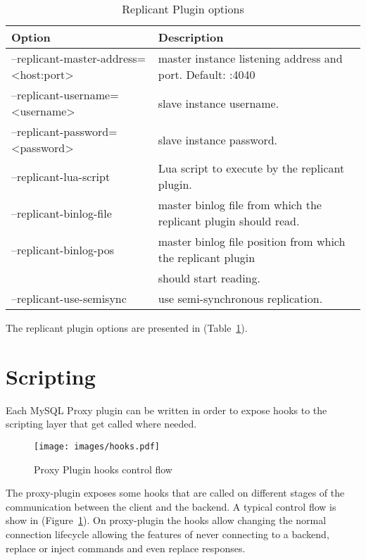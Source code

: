 \begin{table}[h!]
\centering
	\footnotesize
    \begin{tabular}{ | l | l |}
    \hline
    Option & Description \\ \hline
	--replicant-master-address=<host:port> & master instance listening address and port. Default: :4040 \\ \hline
    --replicant-username=<username> & slave instance username. \\ \hline
	--replicant-password=<password>  & slave instance password. \\ \hline
	--replicant-lua-script & Lua script to execute by the replicant plugin. \\ \hline
	--replicant-binlog-file & master binlog file from which the replicant plugin should read. \\ \hline
	--replicant-binlog-pos & master binlog file position from which the replicant plugin\\
	& should start reading. \\ \hline
	--replicant-use-semisync & use semi-synchronous replication. \\ \hline
    \end{tabular}

\caption{Replicant Plugin options}
\label{tab:replicant_plugin_options}
\end{table}

The replicant plugin options are presented in (Table~\ref{tab:replicant_plugin_options}).

\section{Scripting}

Each MySQL Proxy plugin can be written in order to expose hooks to the scripting layer that get called where needed. 


\begin{figure}[h!]
\centering    
\texttt{[image: images/hooks.pdf]}
\caption{Proxy Plugin hooks control flow}
\label{fig:hooks}
\end{figure}


The proxy-plugin exposes some hooks that are called on different stages of the communication between the client and the backend. A typical control flow is show in (Figure~\ref{fig:hooks}). On proxy-plugin the hooks allow changing the normal connection lifecycle allowing the features of never connecting to a backend, replace or inject commands and even replace responses.


